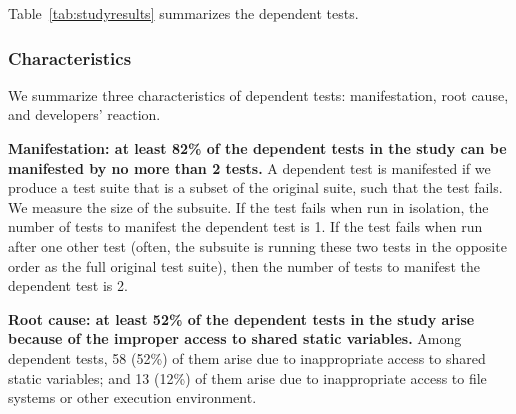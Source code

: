 

Table~\ref{tab:studyresults} summarizes the dependent tests.


\subsubsection{Characteristics}


We summarize three characteristics of dependent tests:
manifestation, root cause, and developers' reaction.

\vspace{1mm}
\noindent \textbf{{Manifestation: at least 82\% of the dependent
tests in the study can be manifested by no more than 2 tests.}}
A dependent test is manifested if we produce a test suite that is a 
subset of the original suite, such that the test fails.
We measure the size of the subsuite.
If the test fails when run in isolation, the number of tests to manifest
the dependent test is 1.
If the test fails when run after one other test (often, the subsuite is
running these two tests in the opposite order as the full original test
suite), then the number of tests to manifest the dependent test is 2.



\vspace{1mm}
\noindent \textbf{{Root cause: at least 52\% of the dependent tests
in the study arise because of the improper access to shared static
variables.}} Among \dtnum dependent tests, 58 (52\%) of them
arise due to inappropriate access to
shared static variables; and 13 (12\%) of them arise
due to inappropriate access to file systems or other
execution environment. 

